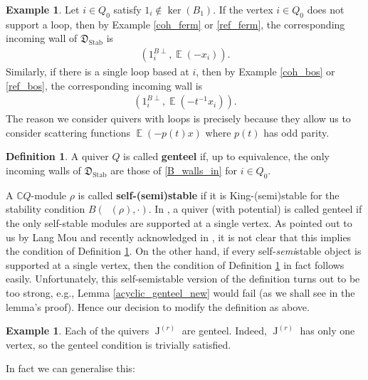 \documentclass{amsart}
\DeclareMathOperator{\moLQ}{J}
\newcommand{\LQ}[1]{\moLQ^{(#1)}}
\DeclareMathOperator{\EE}{\mathbb{E}}
\DeclareMathOperator{\udim}{\underline{\dim}}
\DeclareMathOperator{\Stab}{Stab}
\let\bb=\mathbb
\let\f=\mathfrak
\newcommand{\g}[1]{1_{#1}}
\theoremstyle{plain}%
\theoremstyle{definition}
\newtheorem{dfn}[thm]{Definition}
\newtheorem{eg}[thm]{Example}
\theoremstyle{remark}
\begin{document}
\begin{eg}\label{InEx}
Let $i\in Q_0$ satisfy $1_i\notin \ker(B_1)$.  If the vertex $i\in Q_0$ does not support a loop, then by Example \ref{coh_ferm} or \eqref{ref_ferm}, the corresponding incoming wall of $\f{D}_{\Stab}$ is 
\begin{align*}
    (\g{i}^{B\perp},\EE(-x_i)).
\end{align*}
Similarly, if there is a single loop based at $i$, then by Example \ref{coh_bos} or \eqref{ref_bos}, the corresponding incoming wall is
\begin{align*}
    (\g{i}^{B\perp},\EE(-t^{-1}x_i)).
\end{align*}
The reason we consider quivers with loops is precisely because they allow us to consider scattering functions $\EE(-p(t)x)$ where $p(t)$ has odd parity.
\end{eg}


\begin{dfn}\label{genteel}
A quiver $Q$ is called \textbf{genteel} if, up to equivalence, the only incoming walls of $\f{D}_{\Stab}$ are those of \eqref{B_walls_in} for $i \in Q_0$. 
\end{dfn}





A $\bb{C}Q$-module $\rho$ is called \textbf{self-(semi)stable} if it is King-(semi)stable for the stability condition $B(\udim(\rho),\cdot)$. In \cite[Def. 11.3]{Bridge}, a quiver (with potential) is called genteel if the only self-stable modules are supported at a single vertex.  As pointed out to us by Lang Mou and recently acknowledged in \cite[arXiv v4]{Bridge}, it is not clear that this implies the condition of Definition \ref{genteel}.  On the other hand, if every self-\textit{semi}stable object is supported at a single vertex, then the condition of Definition \ref{genteel} in fact follows easily.  Unfortunately, this self-semistable version of the definition turns out to be too strong, e.g., Lemma \ref{acyclic_genteel_new} would fail (as we shall see in the lemma's proof).  Hence our decision to modify the definition as above.



 \begin{eg}
 \label{J_genteel}
 Each of the quivers $\LQ{r}$ are genteel.  Indeed, $\LQ{r}$ has only one vertex, so the genteel condition is trivially satisfied.
 \end{eg}
In fact we can generalise this:
\end{document}
